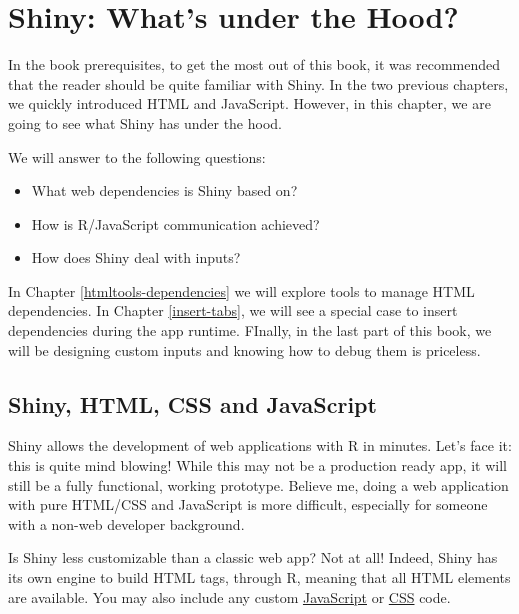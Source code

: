 \documentclass[]{book}
\providecommand{\tightlist}{%
  \setlength{\itemsep}{0pt}\setlength{\parskip}{0pt}}
\begin{document}
\hypertarget{survival-kit-shiny}{%
\chapter{Shiny: What's under the Hood?}\label{survival-kit-shiny}}

In the book prerequisites, to get the most out of this book, it was recommended that the reader should be quite familiar with Shiny. In the two previous chapters, we quickly introduced HTML and JavaScript. However, in this chapter, we are going to see what Shiny has under the hood.

We will answer to the following questions:

\begin{itemize}
\tightlist
\item
  What web dependencies is Shiny based on?
\item
  How is R/JavaScript communication achieved?
\item
  How does Shiny deal with inputs?
\end{itemize}

In Chapter \ref{htmltools-dependencies} we will explore tools to manage HTML dependencies. In Chapter \ref{insert-tabs}, we will see a special case to insert dependencies during the app runtime. FInally, in the last part of this book, we will be designing custom inputs and knowing how to debug them is priceless.

\hypertarget{shiny-html-css-and-javascript}{%
\section{Shiny, HTML, CSS and JavaScript}\label{shiny-html-css-and-javascript}}

Shiny allows the development of web applications with R in minutes. Let's face it: this is quite mind blowing! While this may not be a production ready app, it will still be a fully functional, working prototype. Believe me, doing a web application with pure HTML/CSS and JavaScript is more difficult, especially for someone with a non-web developer background.

Is Shiny less customizable than a classic web app? Not at all! Indeed, Shiny has its own engine to build HTML tags, through R, meaning that all HTML elements are available. You may also include any custom \href{https://shiny.rstudio.com/articles/packaging-javascript.html}{JavaScript} or \href{https://mastering-shiny.org/advanced-ui.html}{CSS} code.
\end{document}
